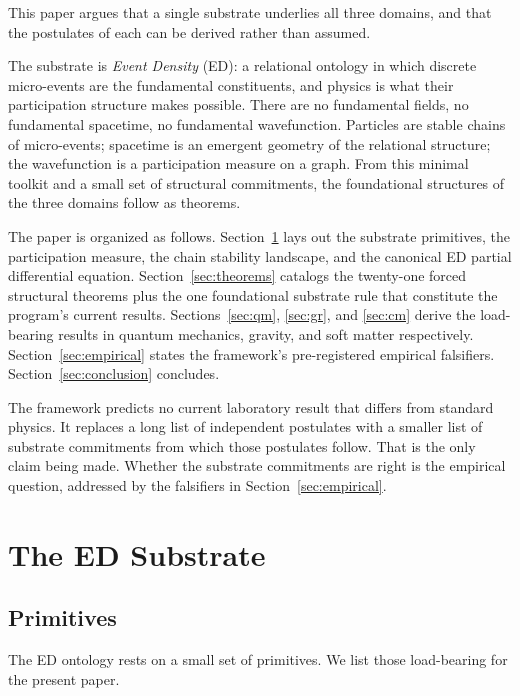 \documentclass[11pt,a4paper]{article}
\begin{document}
This paper argues that a single substrate underlies all three domains, and that the postulates of each can be derived rather than assumed.

The substrate is \emph{Event Density} (ED): a relational ontology in which discrete micro-events are the fundamental constituents, and physics is what their participation structure makes possible. There are no fundamental fields, no fundamental spacetime, no fundamental wavefunction. Particles are stable chains of micro-events; spacetime is an emergent geometry of the relational structure; the wavefunction is a participation measure on a graph. From this minimal toolkit and a small set of structural commitments, the foundational structures of the three domains follow as theorems.

The paper is organized as follows. Section~\ref{sec:substrate} lays out the substrate primitives, the participation measure, the chain stability landscape, and the canonical ED partial differential equation. Section~\ref{sec:theorems} catalogs the twenty-one forced structural theorems plus the one foundational substrate rule that constitute the program's current results. Sections~\ref{sec:qm}, \ref{sec:gr}, and \ref{sec:cm} derive the load-bearing results in quantum mechanics, gravity, and soft matter respectively. Section~\ref{sec:empirical} states the framework's pre-registered empirical falsifiers. Section~\ref{sec:conclusion} concludes.

The framework predicts no current laboratory result that differs from standard physics. It replaces a long list of independent postulates with a smaller list of substrate commitments from which those postulates follow. That is the only claim being made. Whether the substrate commitments are right is the empirical question, addressed by the falsifiers in Section~\ref{sec:empirical}.

\section{The ED Substrate}\label{sec:substrate}

\subsection{Primitives}

The ED ontology rests on a small set of primitives. We list those load-bearing for the present paper.
\end{document}
